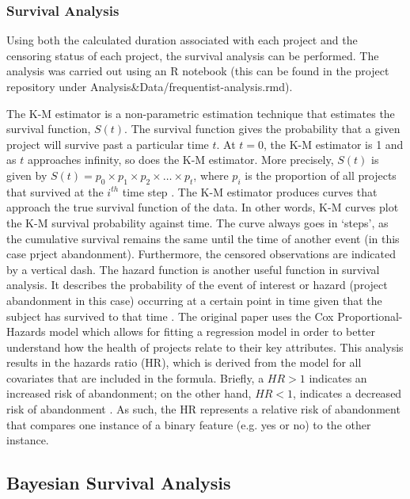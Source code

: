 \documentclass[acmconf]{acmart}
\begin{document}
\subsubsection{Survival Analysis}
Using both the calculated duration associated with each project and the censoring status of each project, the survival analysis can be performed.
The analysis was carried out using an R notebook (this can be found in the project repository under Analysis\&Data/frequentist-analysis.rmd).

The K-M estimator is a non-parametric estimation technique that estimates the survival function, $S(t)$.
The survival function gives the probability that a given project will survive past a particular time $t$.
At $t = 0$, the K-M estimator is 1 and as $t$ approaches infinity, so does the K-M estimator.
More precisely, $S(t)$ is given by  $S(t) = p_0 \times p_1 \times p_2 \times \dots \times p_t$, where $p_i$ is the proportion of all projects that survived at the $i^{th}$ time step \cite{kaplan1958nonparametric}.
The K-M estimator produces curves that approach the true survival function of the data.
In other words, K-M curves plot the K-M survival probability against time.
The curve always goes in ‘steps’, as the cumulative survival remains the same until the time of another event (in this case prject abandonment). Furthermore, the censored observations are indicated by a vertical dash.
The hazard function is another useful function in survival analysis. It describes the probability of the event of interest or hazard (project abandonment in this case) occurring at a certain point in time given that the subject has survived to that time \cite{clark2003go}.
The original paper uses the Cox Proportional-Hazards model which allows for fitting a regression model in order to better understand how the health of projects relate to their key attributes. 
This analysis results in the hazards ratio (HR), which is derived from the model for all covariates that are included in the formula. 
Briefly, a $HR > 1$ indicates an increased risk of abandonment; on the other hand, $HR < 1$, indicates a decreased risk of abandonment \cite{cox1972regression}. 
As such, the HR represents a relative risk of abandonment that compares one instance of a binary feature (e.g. yes or no) to the other instance.

\subsection{Bayesian Survival Analysis}
\end{document}
